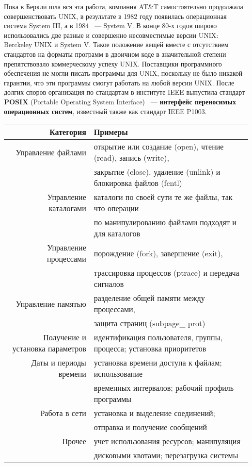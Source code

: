 \documentclass[10pt]{article}
\begin{document}
	Пока в Беркли шла вся эта работа, компания AT\&T самостоятельно продолжала совершенствовать UNIX, в результате в 1982 году появилась операционная система System III, а в 1984 ~--- System V. В конце 80-х годов широко использовались две разные и совершенно несовместимые версии UNIX: Berckeley UNIX и System V. Такое положение вещей вместе с отсутствием стандартов на форматы программ в двоичном коде в значительной степени препятствовало коммерческому успеху UNIX. Поставщики программного обеспечения не могли писать программы для UNIX, поскольку не было никакой гарантии, что эти программы смогут работать на любой версии UNIX. После долгих споров организация по стандартам в институте IEEE выпустила стандарт \textbf{POSIX} (Portable Operating System Interface) ~--- \textbf{интерфейс переносимых операционных систем}, известный также как стандарт IEEE P1003.
	\begin{table}[h!t]
		\begin{tabular}{r | l}
			Категория             & Примеры\\\hline
			Управление файлами    & открытие или создание (open), чтение (read), запись (write),\\
			                      & закрытие (close), удаление (unlink) и блокировка файлов (fcntl)\\\hline
			Управление каталогами & каталоги по своей сути те же файлы, так что операции\\
			                      & по манипулированию файлами подходят и для каталогов\\\hline
			Управление процессами & порождение (fork), завершение (exit),\\
			                      & трассировка процессов (ptrace) и передача сигналов\\\hline
			Управление памятью    & разделение общей памяти между процессами,\\
			                      & защита страниц (subpage\_ prot)\\\hline
			Получение и установка параметров & идентификация пользователя, группы, процесса; установка приоритетов\\\hline
			Даты и периоды времени & установка времени доступа к файлам; использование\\
			                       & временных интервалов; рабочий профиль программы\\\hline
			Работа в сети & установка и выделение соединений;\\
			              & отправка и получение сообщений\\\hline
			Прочее & учет использования ресурсов; манипуляция\\
			       & дисковыми квотами; перезагрузка системы\\\hline
		\end{tabular}
	\end{table}
\end{document}
